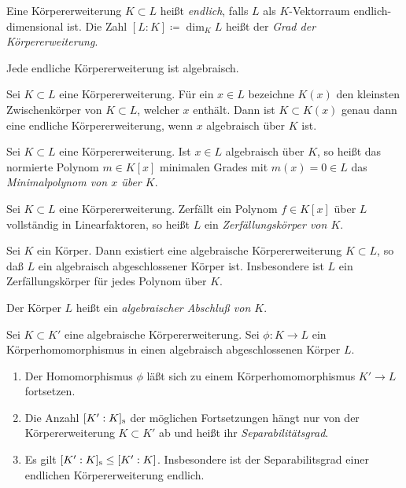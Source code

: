 \begin{definition}
	Eine Körpererweiterung \(K \subset L\) heißt \emph{endlich}, falls
	\(L\) als \(K\)-Vektorraum endlich-dimensional ist. Die Zahl
	\([L : K] \coloneqq \dim_K L\) heißt der \emph{Grad der Körpererweiterung}.
\end{definition}

\begin{example}
	Jede endliche Körpererweiterung ist algebraisch.
\end{example}

\begin{example}
	Sei \(K \subset L\) eine Körpererweiterung. Für ein \(x \in L\) bezeichne
	\(K(x)\) den kleinsten Zwischenkörper von \(K \subset L\), welcher \(x\) enthält.
	Dann ist \(K \subset K(x)\) genau dann eine endliche Körpererweiterung, wenn
	\(x\) algebraisch über \(K\) ist.
\end{example}

\begin{definition}
	Sei \(K \subset L\) eine Körpererweiterung. Ist \(x \in L\) algebraisch
	über \(K\), so heißt das normierte Polynom \(m \in K[x]\) minimalen Grades
	mit \(m(x) = 0 \in L\) das \emph{Minimalpolynom von \(x\) über \(K\)}.
\end{definition}

\begin{definition}
	Sei \(K \subset L\) eine Körpererweiterung. Zerfällt ein Polynom \(f \in K[x]\)
	über \(L\) vollständig in Linearfaktoren, so heißt \(L\) ein \emph{Zerfällungskörper von \(K\)}.
\end{definition}

\begin{theorem}
	Sei \(K\) ein Körper. Dann existiert eine
	algebraische Körpererweiterung \(K \subset L\), so
	daß \(L\) ein algebraisch abgeschlossener Körper ist. Insbesondere ist
	\(L\) ein Zerfällungskörper für jedes Polynom über \(K\).
\end{theorem}

Der Körper \(L\) heißt ein \emph{algebraischer Abschluß von \(K\)}.

\begin{theorem}
	Sei \(K \subset K'\) eine algebraische Körpererweiterung. Sei \(\phi\colon K \to L\)
	ein Körperhomomorphismus in einen algebraisch abgeschlossenen Körper \(L\).
	\begin{enumerate}
	\item
		Der Homomorphismus \(\phi\) läßt sich zu einem Körperhomomorphismus \(K' \to L\) fortsetzen.
	\item
		Die Anzahl \([K' : K]_{\mathrm{s}}\) der möglichen Fortsetzungen hängt nur von der Körpererweiterung
		\(K \subset K'\) ab und heißt ihr \emph{Separabilitätsgrad}.
	\item
		Es gilt \([K' : K]_{\mathrm{s}} \le [K' : K]\). Insbesondere ist der Separabilitsgrad einer endlichen
		Körpererweiterung endlich.
	\end{enumerate}
\end{theorem}

